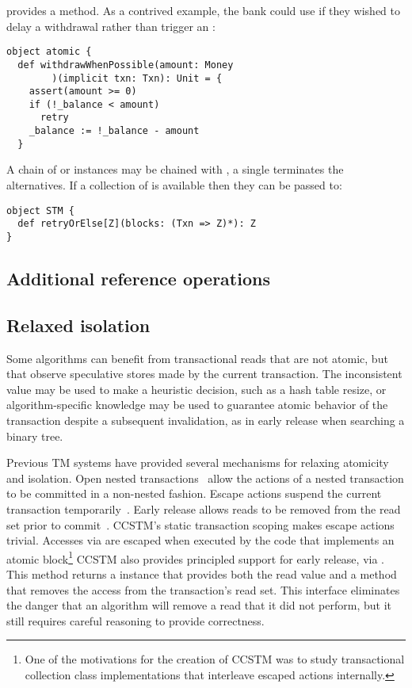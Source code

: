  provides a  method.  As a contrived example,
the bank could use  if they wished to delay a withdrawal
rather than trigger an :
\lstset{numbers=none}
\begin{lstlisting}
object atomic {
  def withdrawWhenPossible(amount: Money
        )(implicit txn: Txn): Unit = {
    assert(amount >= 0)
    if (!_balance < amount)
      retry
    _balance := !_balance - amount
  }
\end{lstlisting}
\lstset{numbers=left}

A chain of  or  instances may be chained
with , a single  terminates the alternatives.
If a collection of \code{~=>~} is available then
they can be passed to:
\lstset{numbers=none}
\begin{lstlisting}
object STM {
  def retryOrElse[Z](blocks: (Txn => Z)*): Z
}
\end{lstlisting}
\lstset{numbers=left}


\subsection{Additional reference operations}

\subsection{Relaxed isolation}
\label{sec:unrecordedread}

Some algorithms can benefit from transactional reads that are not
atomic, but that observe speculative stores made by the current
transaction.  The inconsistent value may be used to make a heuristic decision,
such as a hash table resize, or algorithm-specific knowledge
may be used to guarantee atomic behavior of the transaction despite
a subsequent invalidation, as in early release when searching a binary tree.

Previous TM systems have provided several mechanisms for relaxing atomicity and
isolation.
Open nested transactions~\cite{opennested} allow the actions of a
nested transaction to be committed in a non-nested fashion.  Escape actions
suspend the current transaction temporarily~\cite{escapeaction}.  Early
release
allows reads to be removed from the read set prior to
commit~\cite{HerlihyLMS03}.  CCSTM's static transaction scoping makes escape
actions trivial.  Accesses via  are escaped when executed by the
code that implements an atomic block\footnote{One of the motivations for the
creation of CCSTM was to study transactional collection class implementations
that interleave escaped actions internally.}
CCSTM also provides principled support for
early release, via .  This method returns
a  instance that provides both the read value
and a method that removes the access from the transaction's read set.
This interface eliminates the danger that an algorithm will remove a
read that it did not perform, but it still requires careful reasoning to
provide correctness.

